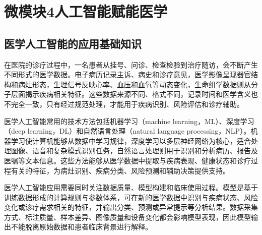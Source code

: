

\part*{微模块4\quad 人工智能赋能医学}


\setcounter{chapter}{8}
\chapter{医学人工智能的应用基础知识}


\setcounter{chapterNineNote}{0}
\newcommand{\chapterNineFootnote}[1]{%
  \refstepcounter{chapterNineNote}%
  \footnotemark[\value{chapterNineNote}]%
  \footnotetext[\value{chapterNineNote}]{#1}%
}

在医院的诊疗过程中，一名患者从挂号、问诊、检查检验到治疗随访，会不断产生不同形式的医学数据。电子病历记录主诉、病史和诊疗意见，医学影像呈现器官结构和病灶形态，生理信号反映心率、血压和血氧等动态变化，生命组学数据则从分子层面揭示疾病相关特征。这些数据来源不同、格式不同，记录时间和医学含义也不完全一致，只有经过规范处理，才能用于疾病识别、风险评估和诊疗辅助。

医学人工智能常用的技术方法包括机器学习（machine learning，ML）、深度学习（deep learning，DL）和自然语言处理（natural language processing，NLP）。机器学习使计算机能够从数据中学习规律，深度学习以多层神经网络为核心，适合处理图像、语音和复杂模式识别任务，自然语言处理则用于识别和分析病历、报告及医嘱等文本信息。这些方法能够从医学数据中提取与疾病表现、健康状态和诊疗过程有关的特征，为病灶识别、疾病分类、风险预测和辅助决策提供支持。

医学人工智能应用需要同时关注数据质量、模型构建和临床使用过程。模型是基于训练数据形成的计算规则与参数体系，可在新的医学数据中识别与疾病状态、风险变化或诊疗需求相关的特征，并输出分类、预测或异常提示等分析结果。数据采集方式、标注质量、样本差异、图像质量和设备变化都会影响模型表现，因此模型输出不能脱离原始数据和患者临床背景进行解释。

